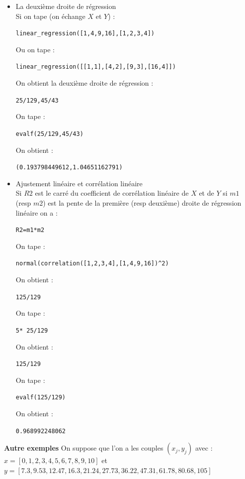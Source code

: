 \documentclass[a4paper,11pt]{book}
\begin{document}
\begin{itemize}
\item La deuxi\`eme droite de r\'egression \\
Si on tape (on \'echange $X$ et $Y$) :
\begin{center}{\tt linear\_regression([1,4,9,16],[1,2,3,4])}\end{center}
Ou on tape :
\begin{center}{\tt linear\_regression([[1,1],[4,2],[9,3],[16,4]])}\end{center}
On obtient la deuxi\`eme droite de r\'egression : 
\begin{center}{\tt 25/129,45/43}\end{center}
On tape :
\begin{center}{\tt evalf(25/129,45/43)}\end{center}
On obtient : 
\begin{center}{\tt (0.193798449612,1.04651162791)}\end{center}
\item Ajustement lin\'eaire et corr\'elation lin\'eaire\\
Si $R2$ est le carr\'e du coefficient de corr\'elation lin\'eaire de $X$ et de
$Y$ si $m1$ (resp $m2$) est la pente de la premi\`ere (resp deuxi\`eme) droite 
de r\'egression lin\'eaire on a :
\begin{center}{\tt R2=m1*m2}\end{center}
On tape :
\begin{center}{\tt normal(correlation([1,2,3,4],[1,4,9,16])\verb|^|2)}\end{center}
On obtient : 
\begin{center}{\tt 125/129}\end{center}
On tape :
\begin{center}{\tt 5* 25/129}\end{center}
On obtient : 
\begin{center}{\tt 125/129}\end{center}
On tape :
\begin{center}{\tt evalf(125/129)}\end{center}
On obtient : 
\begin{center}{\tt 0.968992248062}\end{center}
\end{itemize}
{\bf Autre exemples}
On suppose que l'on a les couples $(x_j,y_j)$  avec :\\
$x=[0,1,2,3,4,5,6,7,8,9,10]$ et\\
$y=[7.3,9.53,12.47,16.3,21.24,27.73,36.22,47.31,61.78,80.68,105]$\\
\end{document}
